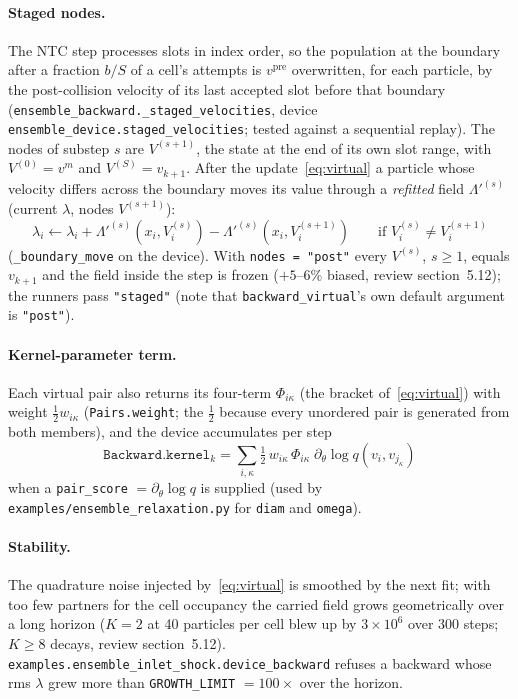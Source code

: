 \documentclass[11pt,a4paper]{article}
\numberwithin{equation}{section}
\newcommand{\code}[1]{\texttt{#1}}
\newcommand{\pre}{\mathrm{pre}}
\newcommand{\Lam}{\Lambda}
\begin{document}
\paragraph{Staged nodes.}
The NTC step processes slots in index order, so the population at the boundary
after a fraction $b/S$ of a cell's attempts is $v^{\pre}$ overwritten, for each
particle, by the post-collision velocity of its last accepted slot before that
boundary (\code{ensemble\_backward.\_staged\_velocities}, device
\code{ensemble\_device.staged\_velocities}; tested against a sequential replay).
The nodes of substep $s$ are $V^{(s+1)}$, the state at the end of its own slot range,
with $V^{(0)} = v^m$ and $V^{(S)} = v_{k+1}$.  After the update~\eqref{eq:virtual} a
particle whose velocity differs across the boundary moves its value through a
\emph{refitted} field $\Lam'^{(s)}$ (current $\lambda$, nodes $V^{(s+1)}$):
\begin{equation}
\label{eq:boundary-move}
\lambda_i \leftarrow \lambda_i + \Lam'^{(s)}(x_i, V^{(s)}_i) - \Lam'^{(s)}(x_i, V^{(s+1)}_i)
\qquad \text{if } V^{(s)}_i \neq V^{(s+1)}_i
\end{equation}
(\code{\_boundary\_move} on the device).  With \code{nodes = "post"} every $V^{(s)}$,
$s \ge 1$, equals $v_{k+1}$ and the field inside the step is frozen ($+5$--$6\%$
biased, review section~5.12); the runners pass \code{"staged"} (note that
\code{backward\_virtual}'s own default argument is \code{"post"}).

\paragraph{Kernel-parameter term.}
Each virtual pair also returns its four-term $\Phi_{i\kappa}$ (the bracket
of~\eqref{eq:virtual}) with weight $\tfrac12 w_{i\kappa}$ (\code{Pairs.weight}; the
$\tfrac12$ because every unordered pair is generated from both members), and the
device accumulates per step
\begin{equation}
\label{eq:kernel-term}
\code{Backward.kernel}_k = \sum_{i,\kappa} \tfrac12\, w_{i\kappa}\, \Phi_{i\kappa}\; \partial_\theta \log q(v_i, v_{j_\kappa})
\end{equation}
when a \code{pair\_score} $= \partial_\theta \log q$ is supplied (used by
\code{examples/ensemble\_relaxation.py} for \code{diam} and \code{omega}).

\paragraph{Stability.}
The quadrature noise injected by~\eqref{eq:virtual} is smoothed by the next fit; with
too few partners for the cell occupancy the carried field grows geometrically over a
long horizon ($K=2$ at 40 particles per cell blew up by $3\times 10^6$ over 300 steps;
$K \ge 8$ decays, review section~5.12).  \code{examples.ensemble\_inlet\_shock.device\_backward}
refuses a backward whose rms $\lambda$ grew more than \code{GROWTH\_LIMIT} $= 100\times$
over the horizon.
\end{document}
